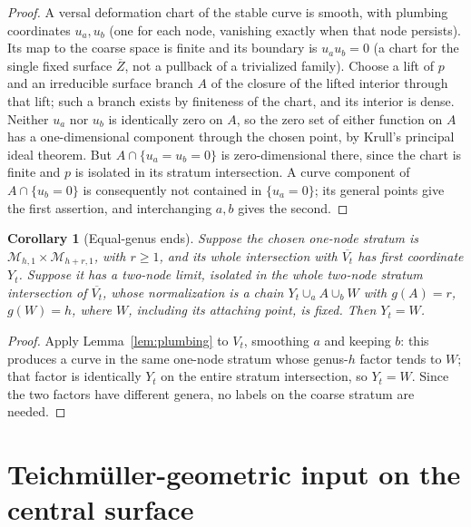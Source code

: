 \documentclass[11pt]{article}
\newcommand{\M}{\mathcal M}
\newcommand{\cl}[1]{\overline{#1}}
\newtheorem{corollary}[theorem]{Corollary}
\theoremstyle{remark}
\begin{document}
\begin{proof}
A versal deformation chart of the stable curve is smooth,
with plumbing coordinates \(u_a,u_b\) (one for each node, vanishing
exactly when that node persists). Its map to the coarse space
is finite and its boundary is \(u_a u_b=0\)
\cite[Sections 8--10, Proposition 12.2 and Corollary 12.3]{HubbardKoch}
(a chart for the single fixed surface \(\cl Z\), not a pullback of a
trivialized family). Choose a lift of \(p\) and an irreducible surface branch \(A\)
of the closure of the lifted interior through that lift; such a
branch exists by finiteness of the chart, and its interior is dense.
Neither \(u_a\) nor \(u_b\) is identically zero on \(A\), so
the zero set of either function on \(A\) has a one-dimensional
component through the chosen point, by Krull's principal ideal
theorem. But \(A\cap\{u_a=u_b=0\}\)
is zero-dimensional there, since the chart is finite and \(p\) is
isolated in its stratum intersection. A curve component of
\(A\cap\{u_b=0\}\) is consequently not contained in \(\{u_a=0\}\);
its general points give the first assertion, and interchanging
\(a,b\) gives the second.
\end{proof}

\begin{corollary}[Equal-genus ends]\label{cor:symmetric}
Suppose the chosen one-node stratum is
\(\M_{h,1}\times\M_{h+r,1}\), with \(r\geq1\), and its whole
intersection with \(\cl{V_t}\) has first coordinate \(Y_t\).
Suppose it has a two-node limit, isolated in the
\emph{whole} two-node stratum intersection of \(\cl{V_t}\),
whose normalization is a chain
\(Y_t\cup_a A\cup_b W\) with \(g(A)=r\), \(g(W)=h\),
where \(W\), including its attaching point, is fixed.
Then \(Y_t=W\).
\end{corollary}

\begin{proof}
Apply Lemma~\ref{lem:plumbing} to \(V_t\), smoothing \(a\) and keeping
\(b\): this produces a curve in the same one-node stratum whose
genus-\(h\) factor tends to \(W\); that factor is identically \(Y_t\)
on the entire stratum intersection, so \(Y_t=W\). Since the two
factors have different genera, no labels on the coarse stratum are
needed.
\end{proof}

\section{Teichm\"uller-geometric input on the central surface}\label{sec:teich}
\end{document}
